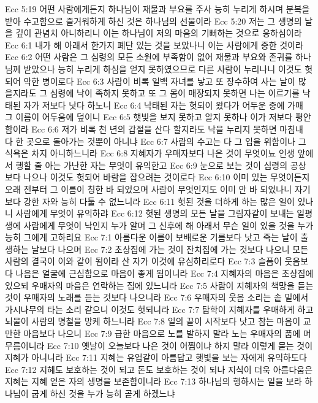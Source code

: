 Ecc 5:19  어떤 사람에게든지 하나님이 재물과 부요를 주사 능히 누리게 하시며 분복을 받아 수고함으로 즐거워하게 하신 것은 하나님의 선물이라
Ecc 5:20  저는 그 생명의 날을 깊이 관념치 아니하리니 이는 하나님이 저의 마음의 기뻐하는 것으로 응하심이라
Ecc 6:1  내가 해 아래서 한가지 폐단 있는 것을 보았나니 이는 사람에게 중한 것이라
Ecc 6:2  어떤 사람은 그 심령의 모든 소원에 부족함이 없어 재물과 부요와 존귀를 하나님께 받았으나 능히 누리게 하심을 얻지 못하였으므로 다른 사람이 누리나니 이것도 헛되어 악한 병이로다
Ecc 6:3  사람이 비록 일백 자녀를 낳고 또 장수하여 사는 날이 많을지라도 그 심령에 낙이 족하지 못하고 또 그 몸이 매장되지 못하면 나는 이르기를 낙태된 자가 저보다 낫다 하노니
Ecc 6:4  낙태된 자는 헛되이 왔다가 어두운 중에 가매 그 이름이 어두움에 덮이니
Ecc 6:5  햇빛을 보지 못하고 알지 못하나 이가 저보다 평안함이라
Ecc 6:6  저가 비록 천 년의 갑절을 산다 할지라도 낙을 누리지 못하면 마침내 다 한 곳으로 돌아가는 것뿐이 아니냐
Ecc 6:7  사람의 수고는 다 그 입을 위함이나 그 식욕은 차지 아니하느니라
Ecc 6:8  지혜자가 우매자보다 나은 것이 무엇이뇨 인생 앞에서 행할 줄 아는 가난한 자는 무엇이 유익한고
Ecc 6:9  눈으로 보는 것이 심령의 공상보다 나으나 이것도 헛되어 바람을 잡으려는 것이로다
Ecc 6:10  이미 있는 무엇이든지 오래 전부터 그 이름이 칭한 바 되었으며 사람이 무엇인지도 이미 안 바 되었나니 자기보다 강한 자와 능히 다툴 수 없느니라
Ecc 6:11  헛된 것을 더하게 하는 많은 일이 있나니 사람에게 무엇이 유익하랴
Ecc 6:12  헛된 생명의 모든 날을 그림자같이 보내는 일평생에 사람에게 무엇이 낙인지 누가 알며 그 신후에 해 아래서 무슨 일이 있을 것을 누가 능히 그에게 고하리요
Ecc 7:1  아름다운 이름이 보배로운 기름보다 낫고 죽는 날이 출생하는 날보다 나으며
Ecc 7:2  초상집에 가는 것이 잔치집에 가는 것보다 나으니 모든 사람의 결국이 이와 같이 됨이라 산 자가 이것에 유심하리로다
Ecc 7:3  슬픔이 웃음보다 나음은 얼굴에 근심함으로 마음이 좋게 됨이니라
Ecc 7:4  지혜자의 마음은 초상집에 있으되 우매자의 마음은 연락하는 집에 있느니라
Ecc 7:5  사람이 지혜자의 책망을 듣는 것이 우매자의 노래를 듣는 것보다 나으니라
Ecc 7:6  우매자의 웃음 소리는 솥 밑에서 가시나무의 타는 소리 같으니 이것도 헛되니라
Ecc 7:7  탐학이 지혜자를 우매하게 하고 뇌물이 사람의 명철을 망케 하느니라
Ecc 7:8  일의 끝이 시작보다 낫고 참는 마음이 교만한 마음보다 나으니
Ecc 7:9  급한 마음으로 노를 발하지 말라 노는 우매자의 품에 머무름이니라
Ecc 7:10  옛날이 오늘보다 나은 것이 어찜이냐 하지 말라 이렇게 묻는 것이 지혜가 아니니라
Ecc 7:11  지혜는 유업같이 아름답고 햇빛을 보는 자에게 유익하도다
Ecc 7:12  지혜도 보호하는 것이 되고 돈도 보호하는 것이 되나 지식이 더욱 아름다움은 지혜는 지혜 얻은 자의 생명을 보존함이니라
Ecc 7:13  하나님의 행하시는 일을 보라 하나님이 굽게 하신 것을 누가 능히 곧게 하겠느냐
